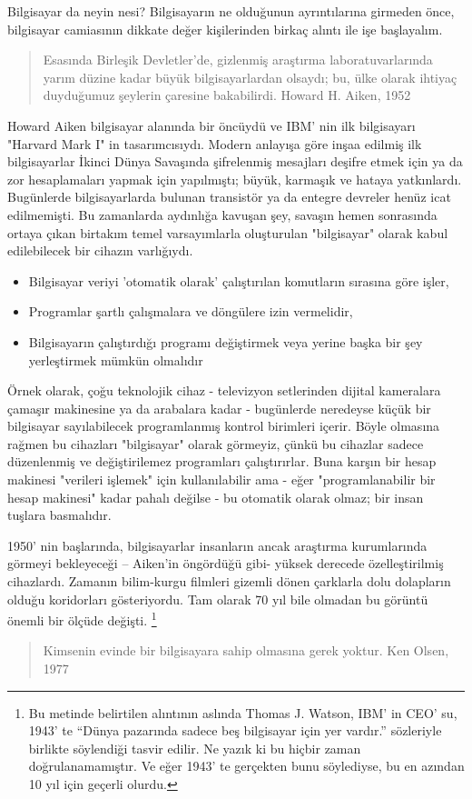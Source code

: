 \documentclass[10pt,a5paper]{book}
\begin{document}
\begin{section}{Bilgisayar da neyin nesi?}
Bilgisayarın ne olduğunun ayrıntılarına girmeden önce, bilgisayar camiasının dikkate değer kişilerinden birkaç alıntı ile işe başlayalım.
\begin{quote}{Esasında Birleşik Devletler'de, gizlenmiş araştırma laboratuvarlarında yarım düzine kadar büyük bilgisayarlardan olsaydı; bu, ülke olarak ihtiyaç duyduğumuz şeylerin çaresine bakabilirdi. Howard H. Aiken, 1952}
\end{quote}
Howard Aiken bilgisayar alanında bir öncüydü ve IBM' nin ilk bilgisayarı "Harvard Mark I" in tasarımcısıydı. Modern anlayışa göre inşaa edilmiş ilk bilgisayarlar İkinci Dünya Savaşında şifrelenmiş mesajları deşifre etmek için ya da zor hesaplamaları yapmak için yapılmıştı; büyük, karmaşık ve hataya yatkınlardı. Bugünlerde bilgisayarlarda bulunan transistör ya da entegre devreler henüz icat edilmemişti. Bu zamanlarda aydınlığa kavuşan şey, savaşın hemen sonrasında ortaya çıkan birtakım temel varsayımlarla oluşturulan "bilgisayar" olarak kabul edilebilecek bir cihazın varlığıydı.
\begin{itemize}
 \item Bilgisayar veriyi 'otomatik olarak' çalıştırılan komutların sırasına göre işler,
 \item Programlar şartlı çalışmalara ve döngülere izin vermelidir,
 \item Bilgisayarın çalıştırdığı programı değiştirmek veya yerine başka bir şey yerleştirmek mümkün olmalıdır
 \end{itemize}

Örnek olarak, çoğu teknolojik cihaz - televizyon setlerinden dijital kameralara çamaşır makinesine ya da arabalara kadar - bugünlerde neredeyse küçük bir bilgisayar sayılabilecek programlanmış kontrol birimleri içerir. Böyle olmasına rağmen bu cihazları "bilgisayar" olarak görmeyiz, çünkü bu cihazlar sadece düzenlenmiş ve değiştirilemez programları çalıştırırlar.  Buna karşın bir hesap makinesi "verileri işlemek" için kullanılabilir ama - eğer "programlanabilir bir hesap makinesi" kadar pahalı değilse - bu otomatik olarak olmaz; bir insan tuşlara basmalıdır.

1950' nin başlarında, bilgisayarlar insanların ancak araştırma kurumlarında görmeyi bekleyeceği – Aiken'in öngördüğü gibi- yüksek derecede özelleştirilmiş cihazlardı. Zamanın bilim-kurgu filmleri gizemli dönen çarklarla dolu dolapların olduğu koridorları gösteriyordu. Tam olarak 70 yıl bile olmadan bu görüntü önemli bir ölçüde değişti. 
\footnote{Bu metinde belirtilen alıntının aslında Thomas J. Watson, IBM' in CEO' su, 1943' te “Dünya pazarında sadece beş bilgisayar için yer vardır.” sözleriyle birlikte söylendiği tasvir edilir. Ne yazık ki bu hiçbir zaman doğrulanamamıştır. Ve eğer 1943' te gerçekten bunu söylediyse, bu en azından 10 yıl için geçerli olurdu.}
\begin{quote}
{Kimsenin evinde bir bilgisayara sahip olmasına gerek yoktur. Ken Olsen, 1977}
\end{quote}


\end{section}
\end{document}

